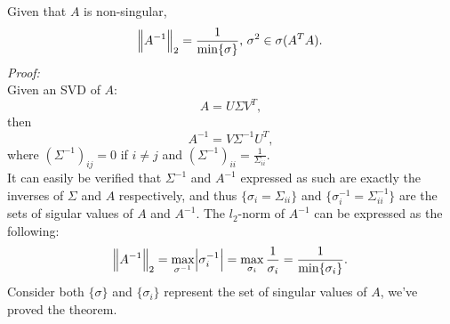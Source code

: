 \documentclass[11pt]{article}
\begin{document}
\subsection{}
Given that $A$ is non-singular, 
$$\norm{A^{-1}}_2 =\frac1{\min\{\sigma\}},\,\sigma^2\in\sigma(A^TA).$$
\textit{Proof:}\\[0.3cm]
Given an SVD of $A$:
$$A = U\Sigma V^T,$$ then
$$A^{-1} = V\Sigma^{-1}U^T,$$
where $(\Sigma^{-1})_{ij} = 0$ if $i\neq j$ and $(\Sigma^{-1})_{ii} = \frac1{\Sigma_{ii}}$.\\[0.3cm]
It can easily be verified that $\Sigma^{-1}$ and $A^{-1}$ expressed as such are exactly the inverses of $\Sigma$ and $A$ respectively, and thus $\{\sigma_i = \Sigma_{ii}\}$ and $\{\sigma^{-1}_i = \Sigma^{-1}_{ii}\}$ are the sets of sigular values of $A$ and $A^{-1}$. The $l_2$-norm of $A^{-1}$ can be expressed as the following:
$$\norm{A^{-1}}_2 = \max_{\sigma^{-1}}{\abs{\sigma^{-1}_i}} = \max_{\sigma_i}\frac1{\sigma_i}=\frac1{\min\{\sigma_i\}}.$$
Consider both $\{\sigma\}$ and $\{\sigma_i\}$ represent the set of singular values of $A$, we've proved the theorem.
\end{document}
